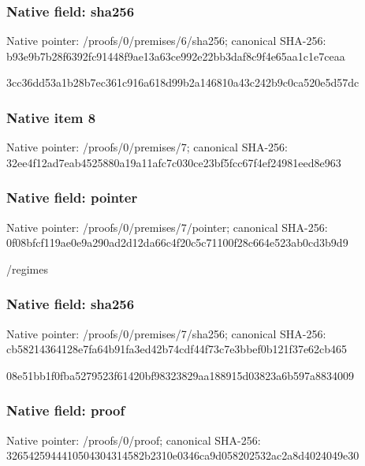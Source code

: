 \documentclass[10pt,a4paper]{article}
\begin{document}
\subsubsection{Native field: sha256}


Native pointer: /proofs/0/premises/6/sha256; canonical SHA-256: b93e9b7b28f6392fc91448f9\allowbreak{}ae13a63ce992e22bb3daf8c9\allowbreak{}f4e65aa1c1e7ceaa


3cc36dd53a1b28b7ec361c91\allowbreak{}6a618d99b2a146810a43c242\allowbreak{}b9c0ca520e5d57dc


\subsubsection{Native item 8}


Native pointer: /proofs/0/premises/7; canonical SHA-256: 32ee4f12ad7eab4525880a19\allowbreak{}a11afc7c030ce23bf5fcc67f\allowbreak{}4ef24981eed8e963



\subsubsection{Native field: pointer}


Native pointer: /proofs/0/premises/7/pointer; canonical SHA-256: 0f08bfcf119ae0e9a290ad2d\allowbreak{}12da66c4f20c5c71100f28c6\allowbreak{}64e523ab0cd3b9d9


/regimes


\subsubsection{Native field: sha256}


Native pointer: /proofs/0/premises/7/sha256; canonical SHA-256: cb58214364128e7fa64b91fa\allowbreak{}3ed42b74cdf44f73c7e3bbef\allowbreak{}0b121f37e62cb465


08e51bb1f0fba5279523f614\allowbreak{}20bf98323829aa188915d038\allowbreak{}23a6b597a8834009


\subsubsection{Native field: proof}


Native pointer: /proofs/0/proof; canonical SHA-256: 326542594441050430431458\allowbreak{}2b2310e0346ca9d058202532\allowbreak{}ac2a8d4024049e30
\end{document}
